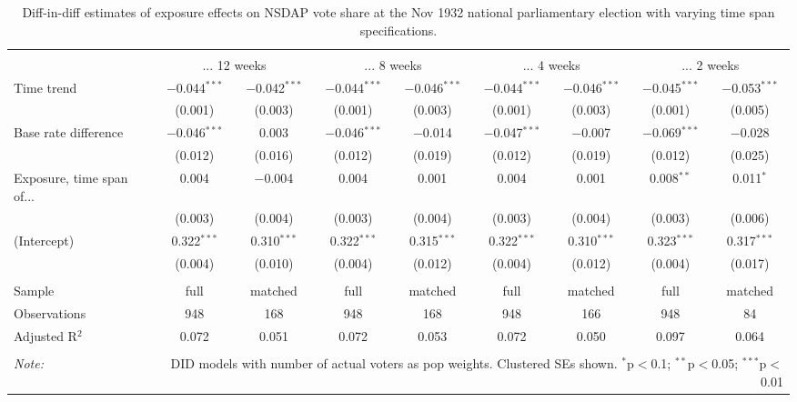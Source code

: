 
\begin{table}[!htbp] \centering 
  \caption{Diff-in-diff estimates of exposure effects on NSDAP vote share at the Nov 1932 national parliamentary election with varying time span specifications.\vspace{-.25cm}} 
  \label{tab:nsdap-voteshare-timespan-dd-1932-2} 
\scriptsize 
\begin{tabular}{@{\extracolsep{5pt}}lcccccccc} 
\\[-1.8ex]\hline 
\hline \\[-1.8ex] 
 & \multicolumn{2}{c}{... 12 weeks} & \multicolumn{2}{c}{... 8 weeks} & \multicolumn{2}{c}{... 4 weeks} & \multicolumn{2}{c}{... 2 weeks} \\ 
 \cmidrule(r){2-3}\cmidrule(r){4-5}\cmidrule(r){6-7}\cmidrule(r){8-9}Time trend & $-$0.044$^{***}$ & $-$0.042$^{***}$ & $-$0.044$^{***}$ & $-$0.046$^{***}$ & $-$0.044$^{***}$ & $-$0.046$^{***}$ & $-$0.045$^{***}$ & $-$0.053$^{***}$ \\ 
  & (0.001) & (0.003) & (0.001) & (0.003) & (0.001) & (0.003) & (0.001) & (0.005) \\ 
  Base rate difference & $-$0.046$^{***}$ & 0.003 & $-$0.046$^{***}$ & $-$0.014 & $-$0.047$^{***}$ & $-$0.007 & $-$0.069$^{***}$ & $-$0.028 \\ 
  & (0.012) & (0.016) & (0.012) & (0.019) & (0.012) & (0.019) & (0.012) & (0.025) \\ 
  Exposure, time span of... & 0.004 & $-$0.004 & 0.004 & 0.001 & 0.004 & 0.001 & 0.008$^{**}$ & 0.011$^{*}$ \\ 
  & (0.003) & (0.004) & (0.003) & (0.004) & (0.003) & (0.004) & (0.003) & (0.006) \\ 
  (Intercept) & 0.322$^{***}$ & 0.310$^{***}$ & 0.322$^{***}$ & 0.315$^{***}$ & 0.322$^{***}$ & 0.310$^{***}$ & 0.323$^{***}$ & 0.317$^{***}$ \\ 
  & (0.004) & (0.010) & (0.004) & (0.012) & (0.004) & (0.012) & (0.004) & (0.017) \\ 
 \hline \\[-1.8ex] 
Sample & full & matched & full & matched & full & matched & full & matched \\ 
Observations & 948 & 168 & 948 & 168 & 948 & 166 & 948 & 84 \\ 
Adjusted R$^{2}$ & 0.072 & 0.051 & 0.072 & 0.053 & 0.072 & 0.050 & 0.097 & 0.064 \\ 
\hline 
\hline \\[-1.8ex] 
\textit{Note:}  & \multicolumn{8}{r}{DID models with number of actual voters as pop weights. Clustered SEs shown. $^{*}$p$<$0.1; $^{**}$p$<$0.05; $^{***}$p$<$0.01} \\ 
\end{tabular} 
\end{table} 
